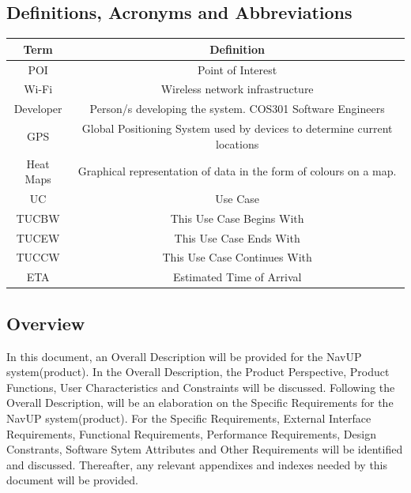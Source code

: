 \documentclass{article}
\begin{document}
    \subsection{Definitions, Acronyms and Abbreviations}
        \begin{table}[h!]
            \centering
            \begin{tabular}{|c|c|}
            \hline
            Term & Definition \\
            \hline
            POI & Point of Interest \\
            \hline
            Wi-Fi & Wireless network infrastructure \\
            \hline
            Developer & Person/s developing the system. COS301 Software Engineers
            \\
            \hline
            GPS & Global Positioning System used by devices to determine current locations
            \\
            \hline
            Heat Maps & Graphical representation of data in the form of colours on a map.
            \\
				  \hline
            UC & Use Case
            \\
 				\hline
            TUCBW & This Use Case Begins With
            \\
			   \hline
            TUCEW & This Use Case Ends With
            \\
 				\hline
            TUCCW & This Use Case Continues With
            \\
				 \hline
            ETA & Estimated Time of Arrival
            \\
            \hline
            \end{tabular}
        \end{table}
    \subsection{Overview}
		\begin{flushleft}
			In this document, an Overall Description will be provided for the NavUP system(product). In the Overall Description, the Product Perspective, Product Functions, User Characteristics and Constraints will be discussed. Following the Overall Description, will be an elaboration on the Specific Requirements for the NavUP system(product). For the Specific Requirements, External Interface Requirements, Functional Requirements, Performance Requirements, Design Constrants, Software Sytem Attributes and Other Requirements will be identified and discussed.
Thereafter, any relevant appendixes and indexes needed by this document will be provided.
		\end{flushleft}
\end{document}
